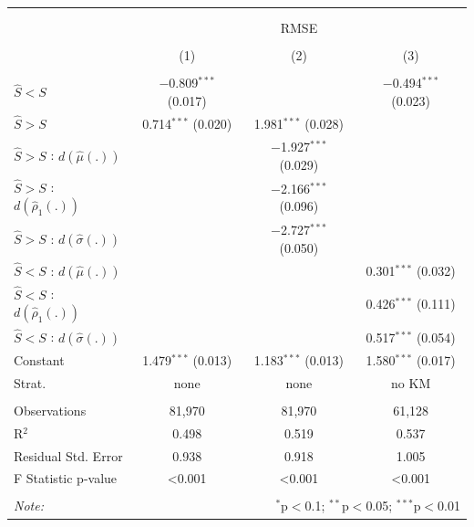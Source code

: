 \begin{tabular}{@{\extracolsep{5pt}}lccc} 
\\[-1.8ex]\hline 
\hline \\[-1.8ex] 
\\[-1.8ex] & \multicolumn{3}{c}{RMSE} \\ 
\\[-1.8ex] & (1) & (2) & (3)\\ 
\hline \\[-1.8ex] 
 $\hat{S} < S$ & $-$0.809$^{***}$ (0.017) &  & $-$0.494$^{***}$ (0.023) \\ 
  $\hat{S} > S$ & 0.714$^{***}$ (0.020) & 1.981$^{***}$ (0.028) &  \\ 
  $\hat{S} > S$ : $d(\hat{\mu}(.))$ &  & $-$1.927$^{***}$ (0.029) &  \\ 
  $\hat{S} > S$ : $d(\hat{\rho}_1(.))$ &  & $-$2.166$^{***}$ (0.096) &  \\ 
  $\hat{S} > S$ : $d(\hat{\sigma}(.))$ &  & $-$2.727$^{***}$ (0.050) &  \\ 
  $\hat{S} < S$ : $d(\hat{\mu}(.))$ &  &  & 0.301$^{***}$ (0.032) \\ 
  $\hat{S} < S$ : $d(\hat{\rho}_1(.))$ &  &  & 0.426$^{***}$ (0.111) \\ 
  $\hat{S} < S$ : $d(\hat{\sigma}(.))$ &  &  & 0.517$^{***}$ (0.054) \\ 
  Constant & 1.479$^{***}$ (0.013) & 1.183$^{***}$ (0.013) & 1.580$^{***}$ (0.017) \\ 
Strat. & none & none & no KM \\
 \hline \\[-1.8ex] 
Observations & 81,970 & 81,970 & 61,128 \\ 
R$^{2}$ & 0.498 & 0.519 & 0.537 \\ 
Residual Std. Error & 0.938 & 0.918 & 1.005 \\ 
F Statistic p-value & <0.001 & <0.001 & <0.001 \\ 
\hline 
\hline \\[-1.8ex] 
\textit{Note:}  & \multicolumn{3}{r}{$^{*}$p$<$0.1; $^{**}$p$<$0.05; $^{***}$p$<$0.01} \\ 
\end{tabular}
